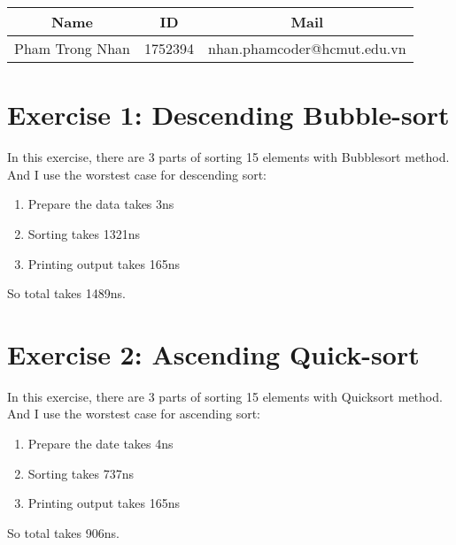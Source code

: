 \documentclass[a4paper, 12pt]{article}
\author{Pham Trong Nhan - 1752394}
\begin{document}
    \begin{tabular}{|c|c|c|}
        \hline
            Name & ID & Mail\\
        \hline
            Pham Trong Nhan & 1752394 & nhan.phamcoder@hcmut.edu.vn\\
        \hline
    \end{tabular}

    \section*{Exercise 1: Descending Bubble-sort}
        In this exercise, there are 3 parts of sorting 15 elements with Bubblesort method.
        And I use the worstest case for descending sort:
        \begin{enumerate}
            \item Prepare the data takes 3ns
            \item Sorting takes 1321ns
            \item Printing output takes 165ns
        \end{enumerate}
        So total takes 1489ns.

    \section*{Exercise 2: Ascending Quick-sort}
        In this exercise, there are 3 parts of sorting 15 elements with Quicksort method.
        And I use the worstest case for ascending sort:
        \begin{enumerate}
            \item Prepare the date takes 4ns
            \item Sorting takes 737ns
            \item Printing output takes 165ns
        \end{enumerate}
        So total takes 906ns.
\end{document}
